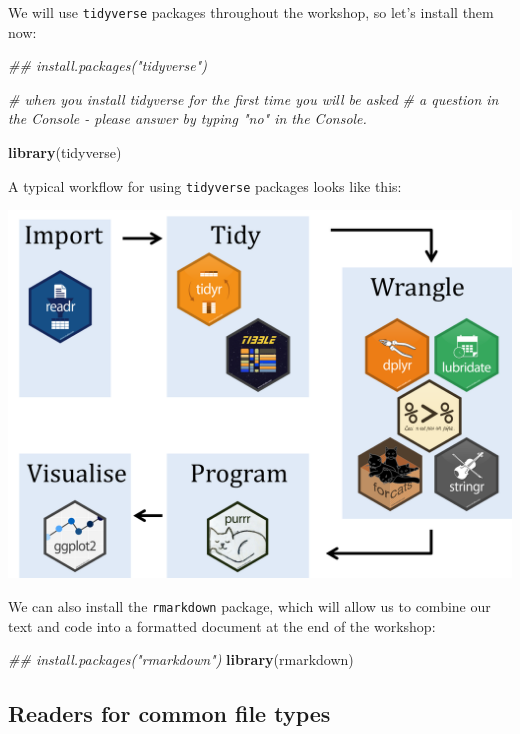 \documentclass[]{book}
\newenvironment{Shaded}{\begin{snugshade}}{\end{snugshade}}
\newcommand{\CommentTok}[1]{\textcolor[rgb]{0.56,0.35,0.01}{\textit{#1}}}
\newcommand{\KeywordTok}[1]{\textcolor[rgb]{0.13,0.29,0.53}{\textbf{#1}}}
\newcommand{\NormalTok}[1]{#1}
\begin{document}
We will use \texttt{tidyverse} packages throughout the
workshop, so let's install them now:

\begin{Shaded}
\begin{Highlighting}[]
\CommentTok{## install.packages("tidyverse")}

\CommentTok{# when you install tidyverse for the first time you will be asked}
\CommentTok{# a question in the Console - please answer by typing "no" in the Console.}

\KeywordTok{library}\NormalTok{(tidyverse)}
\end{Highlighting}
\end{Shaded}

A typical workflow for using \texttt{tidyverse} packages looks like this:

\includegraphics{R/Rintro/images/tidy_workflow.png}

We can also install the \texttt{rmarkdown} package, which will allow us to
combine our text and code into a formatted document at the end of
the workshop:

\begin{Shaded}
\begin{Highlighting}[]
\CommentTok{## install.packages("rmarkdown")}
\KeywordTok{library}\NormalTok{(rmarkdown)}
\end{Highlighting}
\end{Shaded}

\hypertarget{readers-for-common-file-types}{%
\subsection{Readers for common file types}\label{readers-for-common-file-types}}
\end{document}
